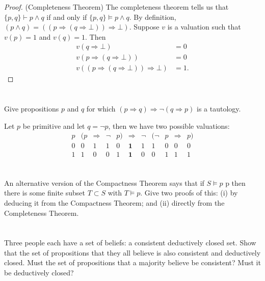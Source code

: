 \documentclass[12pt]{article}
\newenvironment{problem}
    {\begin{lrbox}{\mybox}\begin{minipage}{0.98\textwidth}}
    {\end{minipage}\end{lrbox}\begin{center}\framebox[\textwidth]{\usebox{\mybox}}\end{center}}
\renewcommand{\implies}{\Rightarrow}
\renewcommand{\models}{\vDash}
\newcommand{\proves}{\vdash}
\begin{document}
\begin{proof}(Completeness Theorem)
    The completeness theorem tells us that $\{p, q\} \proves p \land q$ if and only if $\{p, q\} \models p \land q$. By definition, $(p \land q) = ((p \implies (q \implies \bot)) \implies \bot)$. Suppose $v$ is a valuation such that $v(p) = 1$ and $v(q) = 1$. Then
    \begin{align*}
        v(q \implies \bot) &= 0 \\
        v(p \implies (q \implies \bot)) &= 0 \\
        v((p \implies (q \implies \bot)) \implies \bot) &= 1.
    \end{align*}
    
\end{proof}

\section{}
\begin{problem}
    Give propositions $p$ and $q$ for which $(p \implies q) \implies \lnot (q \implies p)$ is a tautology.
\end{problem}

Let $p$ be primitive and let $q = \lnot p$, then we have two possible valuations:
\[
    \begin{array}{c|*{10}{c}}
        p & (p & \implies & \lnot &  p) & \implies & \lnot & (\lnot & p  & \implies & p) \\
        \hline
        0 & 0 & 1 & 1 & 0 & \textbf{1} & 1 & 1 & 0 & 0 & 0 \\
        1 & 1 & 0 & 0 & 1 & \textbf{1} & 0 & 0 & 1 & 1 & 1
    \end{array}
\]

\section{}
\begin{problem}
    An alternative version of the Compactness Theorem says that if $S \models p$ p then there is some finite subset $T \subset S$ with $T \models p$. Give two proofs of this: (i) by deducing it from the Compactness Theorem; and (ii) directly from the Completeness Theorem.
\end{problem}


\newpage
\section{}
\begin{problem}
    Three people each have a set of beliefs: a consistent deductively closed set. Show that the set of propositions that they all believe is also consistent and deductively closed. Must the set of propositions that a majority believe be consistent? Must it be deductively closed?
\end{problem}
\end{document}
